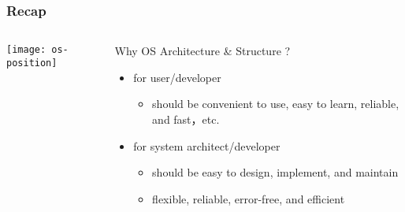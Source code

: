 \begin{frame}[plain]
	\frametitle{Recap}
	
	
	
	\begin{columns}
		
		\begin{column}{.4\textwidth}
			
			\texttt{[image: os-position]}
			
		\end{column}
		
		\begin{column}{.6\textwidth}
			
			\Large
			Why OS Architecture \& Structure ?
			\begin{itemize}
				\item for user/developer
				\begin{itemize}\large
					\item should be convenient to use, easy to learn, reliable, and fast，etc.
				\end{itemize}
			
				\pause
				\item for system architect/developer
				\begin{itemize}\large
					\item should be easy to design, implement, and maintain
					\item flexible, reliable, error-free, and efficient
				\end{itemize}
			\end{itemize}	
			
		\end{column}
		
		
	\end{columns}
	
	
\end{frame}


